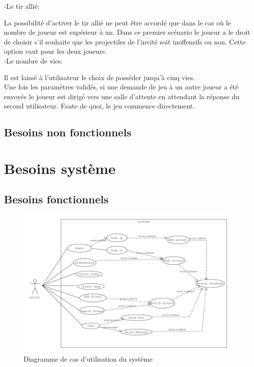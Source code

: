 \documentclass[a4paper,12pt]{article}
\begin{document}
-Le tir allié: 

La possibilité d'activer le tir allié ne peut être accordé que dans le cas où le nombre de joueur est supérieur à un.
Dans ce premier scénario le joueur a le droit de choisir s'il souhaite que les projectiles de l'invité soit inoffensifs ou non. Cette option vaut pour les deux joueurs. \\

-Le nombre de vies: 

Il est laissé à l'utilisateur le choix de posséder jusqu'à cinq vies. \\

Une fois les paramètres validés, si une demande de jeu à un autre joueur a été envoyée le joueur est dirigé vers une salle d'attente en attendant la réponse du second utilisateur. Faute de quoi, le jeu commence directement.

\subsection{Besoins non fonctionnels}

\newpage

\section{Besoins système}
\subsection{Besoins fonctionnels}

\begin{figure}[h!]
\centering
\includegraphics[width=16cm]{NEWSystemUseCase.jpg}
\caption{Diagramme de cas d'utilisation du système}
\label{fig:UerUseCase}
\end{figure}
\end{document}
